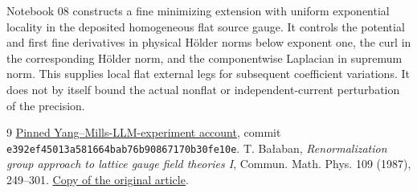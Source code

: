 \documentclass[11pt]{article}
\theoremstyle{remark}
\begin{document}
Notebook 08 constructs a fine minimizing extension with uniform
exponential locality in the deposited homogeneous flat source gauge.
It controls the potential and first fine derivatives in physical
H\"older norms below exponent one, the curl in the corresponding
H\"older norm, and the componentwise Laplacian in supremum norm.
This supplies local flat external legs for subsequent coefficient
variations. It does not by itself bound the actual nonflat or
independent-current perturbation of the precision.

\begin{thebibliography}{9}
 \href{https://github.com/ethanwsussman/Yang--Mills-LLM-experiment/tree/e392ef45013a581664bab76b90867170b30fe10e}
{Pinned Yang--Mills-LLM-experiment account}, commit
\texttt{e392ef4501\allowbreak 3a581664ba\allowbreak b76b908671\allowbreak 70b30fe10e}.
 T. Ba\l aban,
\emph{Renormalization group approach to lattice gauge field theories I},
Commun. Math. Phys. 109 (1987), 249--301.
\href{https://scispace.com/pdf/renormalization-group-approach-to-lattice-gauge-field-3ygai0vxt1.pdf}
{Copy of the original article}.
\end{thebibliography}
\end{document}
